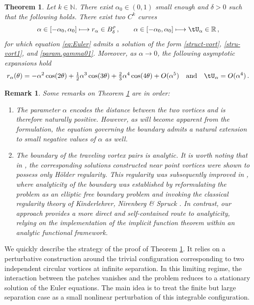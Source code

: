 \documentclass[a4paper,reqno,10pt]{article}
\newtheorem{theo}{Theorem}[section]
\newtheorem{rem}{Remark}[section]
\begin{document}
\begin{theo}\label{Theo-1}
Let $k\in\mathbb{N}$. There exist $\alpha_0 \in (0,1)$ small enough and $\delta>0$ such that the following holds.
There exist two $C^k$ curves
\[
\alpha\in[-\alpha_0,\alpha_0]\longmapsto r_\alpha\in B_\delta^{\rho}\,,
\qquad
\alpha\in[-\alpha_0,\alpha_0]\longmapsto \tU_\alpha\in\mathbb{R}\,,
\]
for which equation \eqref{eq:Euler} admits a solution of the form \eqref{struct-vort}, \eqref{stru-vort1}, and \eqref{param.gamma01}.
Moreover, as $\alpha\to 0$, the following asymptotic expansions hold
\begin{align}
		r_\alpha(\theta) = - \alpha^2 \cos(2\theta)  +\tfrac12 \alpha^3 \cos(3\theta)+\tfrac23 \alpha^4 \cos(4\theta)  + O(\alpha^5)\quad\hbox{and}\quad \tU_\alpha=O(\alpha^4)\,.  \label{r.alpha.th1}
   \end{align}
\end{theo}


\begin{rem} Some remarks on Theorem \ref{Theo-1} are in order:
\begin{enumerate}[label=(\roman*)]
    \item The parameter $\alpha$ encodes the distance between the two vortices and is therefore naturally positive. However, as will become apparent from the formulation, the equation governing the boundary admits a natural extension to small negative values of $\alpha$ as well.
    \item The boundary of the traveling vortex pairs is analytic. It is worth noting that in \cite{Hmidi}, the corresponding solutions constructed near point vortices were shown to possess only H\"older regularity. This regularity was subsequently improved in \cite{GH23}, where analyticity of the boundary was established by reformulating the problem as an elliptic free boundary problem and invoking the classical regularity theory of Kinderlehrer, Nirenberg \& Spruck \cite{Kin1}. In contrast, our approach provides a more direct and self-contained route to analyticity, relying on the implementation of the implicit function theorem within an analytic functional framework.
\end{enumerate}
    
\end{rem}
We quickly describe the strategy of the proof of Theorem \ref{Theo-1}. It relies on a perturbative construction around the trivial configuration corresponding to two independent circular vortices at infinite separation. In this limiting regime, the interaction between the patches vanishes and the problem reduces to a stationary solution of the Euler equations. The main idea is to treat the finite but large separation case as a small nonlinear perturbation of this integrable configuration.
\end{document}

